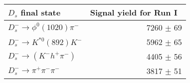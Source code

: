  \begin{tabular}{l r }
\hline\hline
$D_s$ final state  & Signal yield for Run I\ \\
\hline
$D_{s}^{-} \to \phi^{0}(1020)\pi^{-}$ & 7260 $\pm$ 69 \\
$D_{s}^{-}\to K^{*0}(892)K^{-}$ & 5962 $\pm$ 65 \\
$D_{s}^{-}\to (K^{-}h^{+}\pi^{-})$ & 4405 $\pm$ 56 \\
$D_{s}^{-}\to \pi^{+}\pi^{-}\pi^{-}$ & 3817 $\pm$ 51 \\
\hline\hline
\end{tabular}
\label{table:normYieldsDs_run1}
